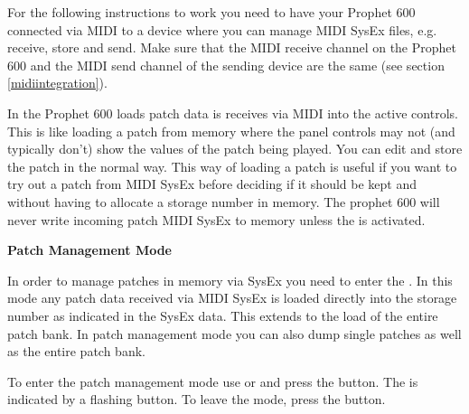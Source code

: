 
For the following instructions to work you need to have your Prophet 600 connected via MIDI to a device where you can manage MIDI SysEx files, e.g. receive, store and send. Make sure that the MIDI receive channel on the Prophet 600 and the MIDI send channel of the sending device are the same (see section \ref{midiintegration}).

In \presetmode the Prophet 600 loads patch data is receives via MIDI into the active controls. This is like loading a patch from memory where the panel controls may not (and typically don't) show the values of the patch being played. You can edit and store the patch in the normal way. This way of loading a patch is useful if you want to try out a patch from MIDI SysEx before deciding if it should be kept and without having to allocate a storage number in memory. The prophet 600 will never write incoming patch MIDI SysEx to memory unless the \patchmgmt is activated. 

\textbf{Patch Management Mode}

In order to manage patches in memory via SysEx you need to enter the \patchmgmt. In this mode any patch data received via MIDI SysEx is loaded directly into the storage number as indicated in the SysEx data. This extends to the load of the entire patch bank. In patch management mode you can also dump single patches as well as the entire patch bank. 

To enter the patch management mode use \shiftmode or \shiftlock and press the \record button. The \patchmgmt is indicated by a flashing \preset button. To leave the mode, press the \record button. 

